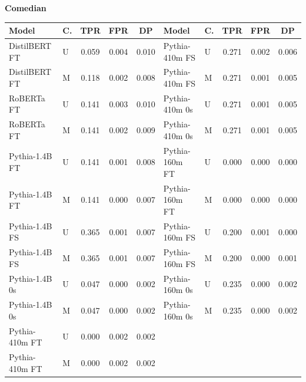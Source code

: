 \documentclass[11pt]{article}
\begin{document}
\vspace{4pt}\noindent\textbf{Comedian}
\begin{center}\scriptsize
\begin{tabular}{llccc|llccc}
\toprule
\textbf{Model} & \textbf{C.} & \textbf{TPR} & \textbf{FPR} & \textbf{DP} & \textbf{Model} & \textbf{C.} & \textbf{TPR} & \textbf{FPR} & \textbf{DP} \\
\midrule
DistilBERT FT & U & 0.059 & 0.004 & 0.010 & Pythia-410m FS & U & 0.271 & 0.002 & 0.006 \\
DistilBERT FT & M & 0.118 & 0.002 & 0.008 & Pythia-410m FS & M & 0.271 & 0.001 & 0.005 \\
RoBERTa FT & U & 0.141 & 0.003 & 0.010 & Pythia-410m 0s & U & 0.271 & 0.001 & 0.005 \\
RoBERTa FT & M & 0.141 & 0.002 & 0.009 & Pythia-410m 0s & M & 0.271 & 0.001 & 0.005 \\
Pythia-1.4B FT & U & 0.141 & 0.001 & 0.008 & Pythia-160m FT & U & 0.000 & 0.000 & 0.000 \\
Pythia-1.4B FT & M & 0.141 & 0.000 & 0.007 & Pythia-160m FT & M & 0.000 & 0.000 & 0.000 \\
Pythia-1.4B FS & U & 0.365 & 0.001 & 0.007 & Pythia-160m FS & U & 0.200 & 0.001 & 0.000 \\
Pythia-1.4B FS & M & 0.365 & 0.001 & 0.007 & Pythia-160m FS & M & 0.200 & 0.000 & 0.001 \\
Pythia-1.4B 0s & U & 0.047 & 0.000 & 0.002 & Pythia-160m 0s & U & 0.235 & 0.000 & 0.002 \\
Pythia-1.4B 0s & M & 0.047 & 0.000 & 0.002 & Pythia-160m 0s & M & 0.235 & 0.000 & 0.002 \\
Pythia-410m FT & U & 0.000 & 0.002 & 0.002 & & & & & \\
Pythia-410m FT & M & 0.000 & 0.002 & 0.002 & & & & & \\
\bottomrule
\end{tabular}
\end{center}
\end{document}
